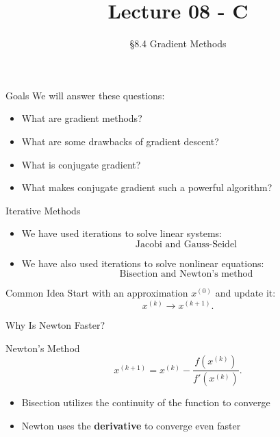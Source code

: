 \documentclass[10pt]{beamer}
\title[Math/CS 375]{Lecture 08 - C}
\subtitle{\S 8.4 Gradient Methods}
\begin{document}
\begin{frame}
  \titlepage
\end{frame}
\begin{frame}{Goals}
We will answer these questions:\\[3mm]
\begin{itemize}
    \item What are gradient methods?
    \item What are some drawbacks of gradient descent?
    \item What is conjugate gradient? 
    \item What makes conjugate gradient such a powerful algorithm?
\end{itemize}
\end{frame}


\begin{frame}{Iterative Methods}

\begin{itemize}
    \item We have used iterations to solve linear systems:
    \[
        \text{Jacobi and Gauss-Seidel}
    \]

    \vfill

    \item We have also used iterations to solve nonlinear equations:
    \[
        \text{Bisection and Newton's method}
    \]
\end{itemize}

\vfill

\begin{block}{Common Idea}
Start with an approximation $x^{(0)}$ and update it:
\[
    x^{(k)} \longrightarrow x^{(k+1)}.
\]
\end{block}

\end{frame}


\begin{frame}{Why Is Newton Faster?}

\begin{block}{Newton's Method}
\[
    x^{(k+1)}
    =
    x^{(k)}-\frac{f(x^{(k)})}{f'(x^{(k)})}.
\]
\end{block}

\begin{itemize}
    \item Bisection utilizes the continuity of the function to converge

    \vfill

    \item Newton uses the \textbf{derivative} to converge even faster
\end{itemize}

\vfill


\end{frame}
\end{document}
